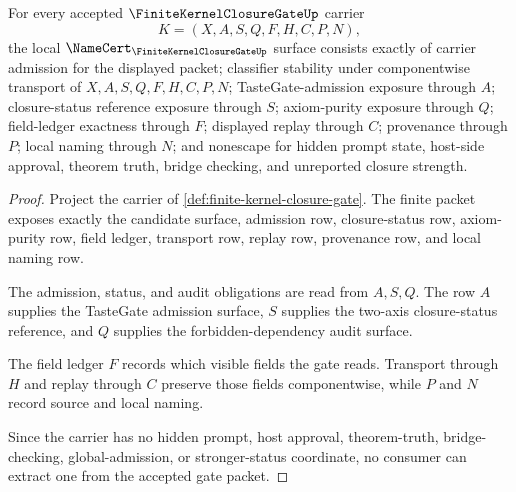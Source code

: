 \begin{theorem}
\label{thm:finite-kernel-closure-gate-namecert-obligations}
For every accepted $\FiniteKernelClosureGateUp$ carrier
$$
K=(X,A,S,Q,F,H,C,P,N),
$$
the local $\NameCert_{\FiniteKernelClosureGateUp}$ surface consists exactly of carrier admission for the displayed packet; classifier stability under componentwise transport of $X,A,S,Q,F,H,C,P,N$; TasteGate-admission exposure through $A$; closure-status reference exposure through $S$; axiom-purity exposure through $Q$; field-ledger exactness through $F$; displayed replay through $C$; provenance through $P$; local naming through $N$; and nonescape for hidden prompt state, host-side approval, theorem truth, bridge checking, and unreported closure strength.
\end{theorem}
\begin{proof}
Project the carrier of \autoref{def:finite-kernel-closure-gate}. The finite packet exposes exactly the candidate surface, admission row, closure-status row, axiom-purity row, field ledger, transport row, replay row, provenance row, and local naming row.

The admission, status, and audit obligations are read from $A,S,Q$. The row $A$ supplies the TasteGate admission surface, $S$ supplies the two-axis closure-status reference, and $Q$ supplies the forbidden-dependency audit surface.

The field ledger $F$ records which visible fields the gate reads. Transport through $H$ and replay through $C$ preserve those fields componentwise, while $P$ and $N$ record source and local naming.

Since the carrier has no hidden prompt, host approval, theorem-truth, bridge-checking, global-admission, or stronger-status coordinate, no consumer can extract one from the accepted gate packet.
\end{proof}

